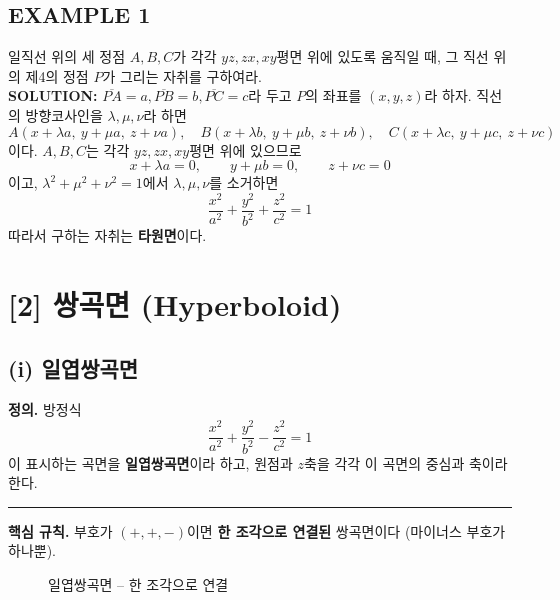 \documentclass{article}
\theoremstyle{mystyle}
\begin{document}
\subsection*{EXAMPLE 1}
일직선 위의 세 정점 \(A,B,C\)가 각각 \(yz,zx,xy\)평면 위에 있도록 움직일 때, 그 직선 위의 제4의 정점 \(P\)가 그리는 자취를 구하여라.\\
\textbf{SOLUTION:}
\(\overline{PA}=a,\overline{PB}=b,\overline{PC}=c\)라 두고 \(P\)의 좌표를 \((x,y,z)\)라 하자. 직선의 방향코사인을 \(\lambda,\mu,\nu\)라 하면
\[
A(x+\lambda a,\ y+\mu a,\ z+\nu a),\quad B(x+\lambda b,\ y+\mu b,\ z+\nu b),\quad C(x+\lambda c,\ y+\mu c,\ z+\nu c)
\]
이다. \(A,B,C\)는 각각 \(yz,zx,xy\)평면 위에 있으므로
\[
x+\lambda a=0,\qquad y+\mu b=0,\qquad z+\nu c=0
\]
이고, \(\lambda^2+\mu^2+\nu^2=1\)에서 \(\lambda,\mu,\nu\)를 소거하면
\[
\frac{x^2}{a^2}+\frac{y^2}{b^2}+\frac{z^2}{c^2}=1
\]
따라서 구하는 자취는 \textbf{타원면}이다.

\section*{[2] 쌍곡면 (Hyperboloid)}

\subsection*{(i) 일엽쌍곡면}

\begin{tcolorbox}[
    colback=teal!4,
    colframe=teal!65!black,
    title=정의 \& 핵심 규칙,
    fonttitle=\bfseries,
    boxrule=0.5mm,
    arc=3mm
    ]
    \textbf{\textcolor{teal!65!black}{정의.}}\quad
    방정식
    \[
    \frac{x^2}{a^2}+\frac{y^2}{b^2}-\frac{z^2}{c^2}=1 \tag{2}
    \]
    이 표시하는 곡면을 \textbf{일엽쌍곡면}이라 하고, 원점과 \(z\)축을 각각 이 곡면의 중심과 축이라 한다.

    \noindent\textcolor{teal!50!black}{\rule{\linewidth}{0.4pt}}

    \textbf{\textcolor{teal!65!black}{핵심 규칙.}}\quad
    부호가 \((+,+,-)\)이면 \textbf{한 조각으로 연결된} 쌍곡면이다 (마이너스 부호가 하나뿐).
\end{tcolorbox}

\begin{figure}[h]
\centering
{}
\caption{일엽쌍곡면 -- 한 조각으로 연결}
\end{figure}
\end{document}
